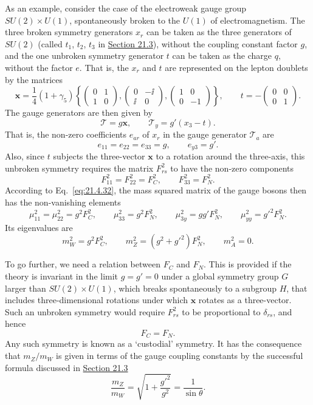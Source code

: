 As an example, consider the case of the electroweak gauge group $SU(2)\times U(1)$, spontaneously broken to the $U(1)$ of electromagnetism. The three broken symmetry generators $x_r$ can be taken as the three generators of $SU(2)$ (called $t_1$, $t_2$, $t_3$ in \hyperref[sec:21.3]{Section 21.3}), without the coupling constant factor $g$, and the one unbroken symmetry generator $t$ can be taken as the charge $q$, without the factor $e$. That is, the $x_r$ and $t$ are represented on the lepton doublets by the matrices
\[
\mathbf{x}=\frac{1}{4}(1+\gamma_5)
\left\{
\begin{pmatrix}0&1\\1&0\end{pmatrix},
\begin{pmatrix}0&-\ii\\\ii&0\end{pmatrix},
\begin{pmatrix}1&0\\0&-1\end{pmatrix}
\right\},
\qquad
t=-\begin{pmatrix}0&0\\0&1\end{pmatrix}.
\]
The gauge generators are then given by
\begin{equation}
\mathbf{\mathcal T}=g\mathbf{x},
\qquad
\mathcal T_y=g'(x_3-t).
\tag{21.4.34}\label{eq:21.4.34}
\end{equation}
That is, the non-zero coefficients $e_{a r}$ of $x_r$ in the gauge generator $\mathcal T_a$ are
\[
e_{11}=e_{22}=e_{33}=g,
\qquad
e_{y3}=g'.
\]
Also, since $t$ subjects the three-vector $\mathbf{x}$ to a rotation around the three-axis, this unbroken symmetry requires the matrix $F_{rs}^2$ to have the non-zero components
\[
F_{11}^2=F_{22}^2=F_C^2,
\qquad
F_{33}^2=F_N^2.
\]
According to Eq.~\eqref{eq:21.4.32}, the mass squared matrix of the gauge bosons then has the non-vanishing elements
\[
\mu_{11}^2=\mu_{22}^2=g^2F_C^2,
\qquad
\mu_{33}^2=g^2F_N^2,
\qquad
\mu_{3y}^2=gg'F_N^2,
\qquad
\mu_{yy}^2=g'^2F_N^2.
\]
Its eigenvalues are
\begin{equation}
m_W^2=g^2F_C^2,
\qquad
m_Z^2=(g^2+g'^2)F_N^2,
\qquad
m_A^2=0.
\tag{21.4.35}\label{eq:21.4.35}
\end{equation}

To go further, we need a relation between $F_C$ and $F_N$. This is provided if the theory is invariant in the limit $g=g'=0$ under a global symmetry group $G$ larger than $SU(2)\times U(1)$, which breaks spontaneously to a subgroup $H$, that includes three-dimensional rotations under which $\mathbf{x}$ rotates as a three-vector. Such an unbroken symmetry would require $F_{rs}^2$ to be proportional to $\delta_{rs}$, and hence
\[
F_C=F_N.
\]
Any such symmetry is known as a `custodial' symmetry. It has the consequence that $m_Z/m_W$ is given in terms of the gauge coupling constants by the successful formula discussed in \hyperref[sec:21.3]{Section 21.3}
\begin{equation}
\frac{m_Z}{m_W}
=\sqrt{1+\frac{g'^2}{g^2}}
=\frac{1}{\sin\theta}.
\tag{21.4.36}\label{eq:21.4.36}
\end{equation}

